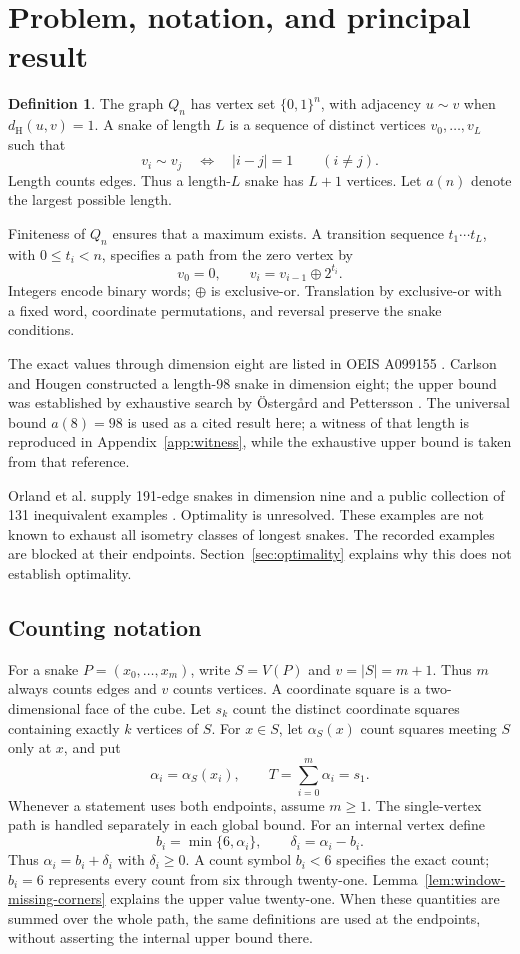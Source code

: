 \documentclass[11pt,a4paper]{article}
\theoremstyle{definition}
\newtheorem{definition}[theorem]{Definition}
\theoremstyle{remark}
\newcommand{\Q}{Q}
\newcommand{\Ham}{d_{\mathrm H}}
\begin{document}
\section{Problem, notation, and principal result}\label{sec:problem}
\begin{definition}
The graph $\Q_n$ has vertex set $\{0,1\}^n$, with adjacency $u\sim v$ when $\Ham(u,v)=1$. A snake of length $L$ is a sequence of distinct vertices $v_0,\ldots,v_L$ such that
\[
v_i\sim v_j\quad\Longleftrightarrow\quad |i-j|=1\qquad(i\ne j).
\]
Length counts edges. Thus a length-$L$ snake has $L+1$ vertices. Let $a(n)$ denote the largest possible length.
\end{definition}
Finiteness of $\Q_n$ ensures that a maximum exists. A transition sequence $t_1\cdots t_L$, with $0\le t_i<n$, specifies a path from the zero vertex by
\[
v_0=0,\qquad v_i=v_{i-1}\mathbin{\oplus}2^{t_i}.
\]
Integers encode binary words; $\oplus$ is exclusive-or. Translation by exclusive-or with a fixed word, coordinate permutations, and reversal preserve the snake conditions.

The exact values through dimension eight are listed in OEIS A099155 \cite{oeis}. Carlson and Hougen constructed a length-98 snake in dimension eight; the upper bound was established by exhaustive search by Östergård and Pettersson \cite{ostergard}. The universal bound $a(8)=98$ is used as a cited result here; a witness of that length is reproduced in Appendix~\ref{app:witness}, while the exhaustive upper bound is taken from that reference.

Orland et al. supply 191-edge snakes in dimension nine and a public collection of 131 inequivalent examples \cite{orland,data}. Optimality is unresolved. These examples are not known to exhaust all isometry classes of longest snakes. The recorded examples are blocked at their endpoints. Section~\ref{sec:optimality} explains why this does not establish optimality.

\subsection{Counting notation}
For a snake $P=(x_0,\ldots,x_m)$, write $S=V(P)$ and $v=|S|=m+1$. Thus $m$ always counts edges and $v$ counts vertices. A coordinate square is a two-dimensional face of the cube. Let $s_k$ count the distinct coordinate squares containing exactly $k$ vertices of $S$. For $x\in S$, let $\alpha_S(x)$ count squares meeting $S$ only at $x$, and put
\[
\alpha_i=\alpha_S(x_i),\qquad T=\sum_{i=0}^{m}\alpha_i=s_1.
\]
Whenever a statement uses both endpoints, assume $m\ge1$. The single-vertex path is handled separately in each global bound.
For an internal vertex define
\[
b_i=\min\{6,\alpha_i\},\qquad \delta_i=\alpha_i-b_i.
\]
Thus $\alpha_i=b_i+\delta_i$ with $\delta_i\ge0$. A count symbol $b_i<6$ specifies the exact count; $b_i=6$ represents every count from six through twenty-one. Lemma~\ref{lem:window-missing-corners} explains the upper value twenty-one. When these quantities are summed over the whole path, the same definitions are used at the endpoints, without asserting the internal upper bound there.
\end{document}
